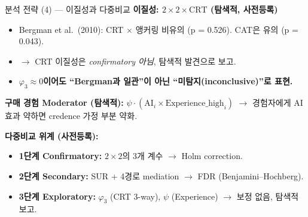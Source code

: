 \documentclass[aspectratio=169]{beamer}
\begin{document}
\begin{frame}{분석 전략 (4) --- 이질성과 다중비교}
  \textbf{이질성: $2 \times 2 \times \mathrm{CRT}$ (탐색적, 사전등록)}
  \begin{itemize}
    \item Bergman et al.\ (2010): CRT $\times$ 앵커링 비유의 (p = 0.526). CAT은 유의 (p = 0.043).
    \item $\rightarrow$ CRT 이질성은 \emph{confirmatory 아님}, 탐색적 발견으로 보고.
    \item \textbf{$\varphi_3 \approx 0$이어도 ``Bergman과 일관''이 아닌 ``미탐지(inconclusive)''로 표현.}
  \end{itemize}

  \vspace{0.4em}
  \textbf{구매 경험 Moderator (탐색적):}
  $\psi \cdot (\mathrm{AI}_i \times \mathrm{Experience\_high}_i)$
  $\rightarrow$ 경험자에게 AI 효과 약하면 credence 가정 부분 약화.

  \vspace{0.4em}
  \textbf{다중비교 위계 (사전등록):}
  \begin{itemize}\itemsep0.05em
    \item \textbf{1단계 Confirmatory:} $2 \times 2$의 3개 계수 $\rightarrow$ Holm correction.
    \item \textbf{2단계 Secondary:} SUR + 4경로 mediation $\rightarrow$ FDR (Benjamini--Hochberg).
    \item \textbf{3단계 Exploratory:} $\varphi_3$ (CRT 3-way), $\psi$ (Experience) $\rightarrow$ 보정 없음, 탐색적 보고.
  \end{itemize}
\end{frame}

\end{document}
